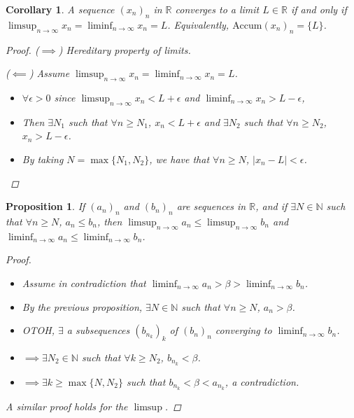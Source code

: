 \documentclass[10pt]{article}
\newcommand{\N}{\mathbb{N}}
\newcommand{\R}{\mathbb{R}}
\newtheorem{corollary}[theorem]{Corollary}
\newtheorem{proposition}[theorem]{Proposition}
\theoremstyle{definition}
\theoremstyle{remark}
\begin{document}
\begin{corollary}
    A sequence $(x_n)_n$ in $\R$ converges to a limit $L \in \R$ if and only if $\limsup_{n \to \infty} x_n = \liminf_{n \to \infty} x_n = L$.
    Equivalently, $\text{Accum}(x_n)_n = \{L\}$.

    \begin{proof}
        ($\implies$) Hereditary property of limits.

        ($\impliedby$) Assume $\limsup_{n \to \infty} x_n = \liminf_{n \to \infty} x_n = L$.
        \begin{itemize}
            \item $\forall \epsilon > 0$ since $\limsup_{n \to \infty} x_n < L + \epsilon$ and $\liminf_{n \to \infty} x_n > L - \epsilon$,
            \item Then $\exists N_1$ such that $\forall n \geq N_1$, $x_n < L + \epsilon$ and $\exists N_2$ such that $\forall n \geq N_2$, $x_n > L - \epsilon$.
            \item By taking $N = \max\{N_1, N_2\}$, we have that $\forall n \geq N$, $|x_n - L| < \epsilon$.
        \end{itemize}
    \end{proof}
\end{corollary}

\begin{proposition}
    If $(a_n)_n$ and $(b_n)_n$ are sequences in $\R$, and if $\exists N \in \N$ such that $\forall n \geq N$, $a_n \leq b_n$,
    then $\limsup_{n \to \infty} a_n \leq \limsup_{n \to \infty} b_n$ and $\liminf_{n \to \infty} a_n \leq \liminf_{n \to \infty} b_n$.
    \begin{proof}
        \hfill
        \begin{itemize}
            \item Assume in contradiction that $\liminf_{n \to \infty} a_n > \beta > \liminf_{n \to \infty} b_n$.
            \item By the previous proposition, $\exists N \in \N$ such that $\forall n \geq N$, $a_n > \beta$.
            \item OTOH, $\exists$ a subsequences $(b_{n_k})_k$ of $(b_n)_n$ converging to $\liminf_{n \to \infty} b_n$.
            \item $\implies \exists N_2 \in \N$ such that $\forall k \geq N_2$, $b_{n_k} < \beta$.
            \item $\implies \exists k \geq \max\{N, N_2\}$ such that $b_{n_k} < \beta < a_{n_k}$, a contradiction.
        \end{itemize}
        A similar proof holds for the $\limsup$.
    \end{proof}
\end{proposition}
\end{document}

